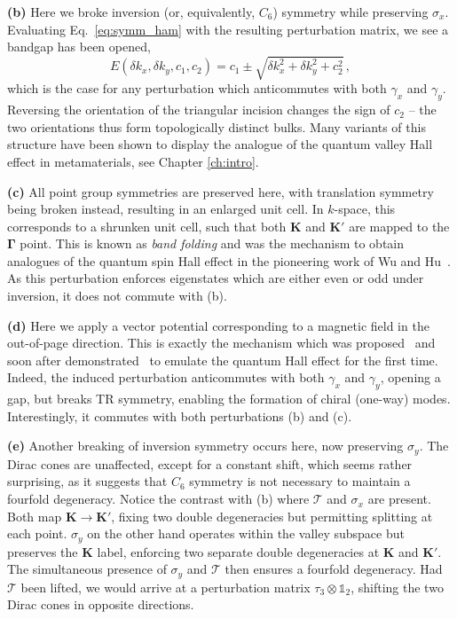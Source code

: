 \textbf{(b)} Here we broke inversion (or, equivalently, $C_6$) symmetry while preserving $\sigma_x$. Evaluating Eq.~\eqref{eq:symm_ham} with the resulting perturbation matrix, we see a bandgap has been opened,
\begin{equation}
E(\delta k_x, \delta k_y, c_1, c_2) = c_1 \pm \sqrt{\delta k_x^2 + \delta k_y^2 + c_2^2} \,,
\end{equation}
which is the case for any perturbation which anticommutes with both $\gamma_x$ and $\gamma_y$. Reversing the orientation of the triangular incision changes the sign of $c_2$ -- the two orientations thus form topologically distinct bulks. Many variants of this structure have been shown to display the analogue of the quantum valley Hall effect in metamaterials, see Chapter \ref{ch:intro}.

\textbf{(c)} All point group symmetries are preserved here, with translation symmetry being broken instead, resulting in an enlarged unit cell. In $k$-space, this corresponds to a shrunken unit cell, such that both $\boldsymbol{K}$ and $\boldsymbol{K'}$ are mapped to the $\boldsymbol{\Gamma}$ point. This is known as \textit{band folding} and was the mechanism to obtain analogues of the quantum spin Hall effect in the pioneering work of Wu and Hu~\cite{Wu_Hu_2015}. As this perturbation enforces eigenstates which are either even or odd under inversion, it does not commute with (b).  

\textbf{(d)} Here we apply a vector potential corresponding to a magnetic field in the out-of-page direction. This is exactly the mechanism which was proposed~\cite{Haldane_2008} and soon after demonstrated~\cite{Wang_2009} to emulate the quantum Hall effect for the first time. Indeed, the induced perturbation anticommutes with both $\gamma_x$ and $\gamma_y$, opening a gap, but breaks TR symmetry, enabling the formation of chiral (one-way) modes. Interestingly, it commutes with both perturbations (b) and (c). 

\textbf{(e)} Another breaking of inversion symmetry occurs here, now preserving $\sigma_y$. The Dirac cones are unaffected, except for a constant shift, which seems rather surprising, as it suggests that $C_6$ symmetry is not necessary to maintain a fourfold degeneracy. Notice the contrast with (b) where $\mathcal{T}$ and $\sigma_x$ are present. Both map $\boldsymbol{K} \rightarrow \boldsymbol{K'}$, fixing two double degeneracies but permitting splitting at each point. $\sigma_y$ on the other hand operates within the valley subspace but preserves the $\boldsymbol{K}$ label, enforcing two separate double degeneracies at $\boldsymbol{K}$ and $\boldsymbol{K'}$. The simultaneous presence of $\sigma_y$ and $\mathcal{T}$ then ensures a fourfold degeneracy. Had $\mathcal{T}$ been lifted, we would arrive at a perturbation matrix $\tau_3 \otimes \mathbb{1}_2$, shifting the two Dirac cones in opposite directions.

